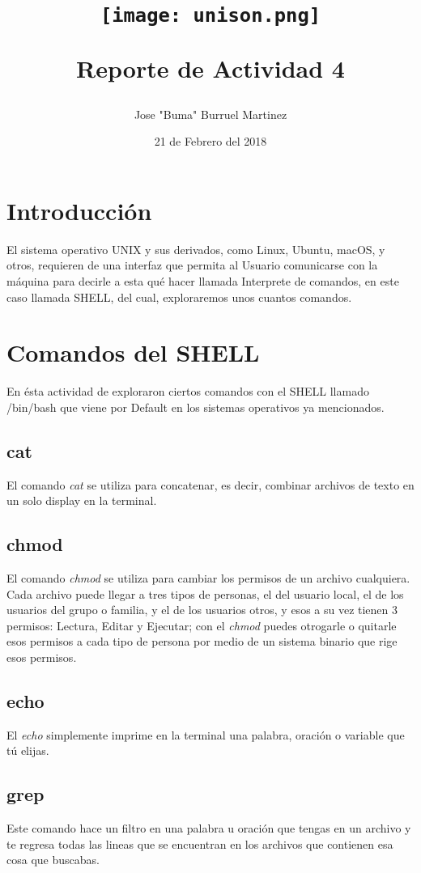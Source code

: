 \documentclass{article}
\title{ \begin{center}
        \texttt{[image: unison.png]}
        \end{center}
        \newline
       Reporte de Actividad 4}
\author{Jose "Buma" Burruel Martinez}
\date{21 de Febrero del 2018}
\begin{document}

\section{Introducción}
El sistema operativo UNIX y sus derivados, como Linux, Ubuntu, macOS, y otros, requieren de una interfaz que permita al Usuario comunicarse con la máquina para decirle a esta qué hacer llamada Interprete de comandos, en este caso llamada SHELL, del cual, exploraremos unos cuantos comandos.

\section{Comandos del SHELL}
En ésta actividad de exploraron ciertos comandos con el SHELL llamado /bin/bash que viene por Default en los sistemas operativos ya mencionados. 
\subsection{cat}
El comando \textit{cat} se utiliza para concatenar, es decir, combinar archivos de texto en un solo display en la terminal.
\subsection{chmod}
El comando \textit{chmod} se utiliza para cambiar los permisos de un archivo cualquiera.
Cada archivo puede llegar a tres tipos de personas, el del usuario local, el de los usuarios del grupo o familia, y el de los usuarios otros, y esos a su vez tienen 3 permisos: Lectura, Editar y Ejecutar; con el \textit{chmod} puedes otrogarle o quitarle esos permisos a cada tipo de persona por medio de un sistema binario que rige esos permisos.
\subsection{echo}
El \textit{echo} simplemente imprime en la terminal una palabra, oración o variable que tú elijas.
\subsection{grep}
Este comando hace un filtro en una palabra u oración que tengas en un archivo y te regresa todas las lineas que se encuentran en los archivos que contienen esa cosa que buscabas.
\end{document}
